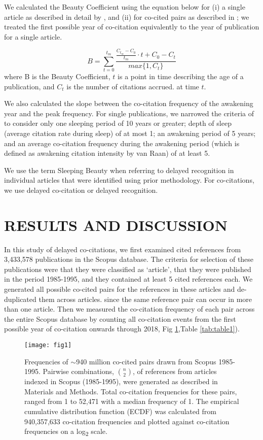\documentclass[utf8]{frontiersSCNS}
\begin{document}
We calculated the Beauty Coefficient using the equation below for (i) a single article as described in detail by \cite{Ke2015}, and (ii) for co-cited pairs as described in \cite{devarakonda_2020}; we treated the first possible year of co-citation equivalently to the year of publication for a single article. 

$$ B=  \sum_{t=0}^{t_m} \frac {\frac{C_{t_m} - C_0}{t_m} \cdot t + C_0 - C_t} {max\{1,C_t\}} $$ where B is the Beauty Coefficient, $t$ is a point in time describing the age of a publication, and $C_t$ is the number of citations accrued. at time $t$. 

We  also calculated the slope between the co-citation frequency of the awakening year and the peak frequency. For single publications, we narrowed the criteria of \cite{Raan2019} to consider only one sleeping period of 10 years or greater; depth of sleep (average citation rate during sleep) of at most 1; an awakening period of 5 years; and an average co-citation frequency during the awakening period (which is defined as awakening citation intensity by van Raan) of at least 5. 

We use the term Sleeping Beauty when referring to delayed recognition in individual articles that were identified using prior methodology. For co-citations, we use delayed co-citation or delayed recognition.

\section{RESULTS AND DISCUSSION}

In this study of delayed co-citations, we first examined cited references from 3,433,578 publications in the Scopus database. The criteria for selection of these publications were that they were classified as `article', that they were published in the period 1985-1995, and they contained at least 5 cited references each. We generated all possible co-cited pairs for the references in these articles and de-duplicated them across articles. since the same reference pair can occur in more than one article. Then we measured the co-citation frequency of each pair across the entire Scopus database by counting all co-citation events from the first possible year of co-citation onwards through 2018, Fig \ref{fig:fig1},Table \ref{tab:table1}).

\begin{figure}[h!]
\begin{center}
\texttt{[image: fig1]}%
\end{center}
\caption{Frequencies of $\sim$940 million co-cited pairs drawn from Scopus 1985-1995. Pairwise combinations, $n\choose 2$, of references from articles indexed in Scopus (1985-1995), were generated as described in Materials and Methods. Total co-citation frequencies for these pairs, ranged from 1 to 52,471 with a median frequency of 1. The empirical cumulative distribution function (ECDF) was calculated from 940,357,633 co-citation frequencies and plotted against co-citation frequencies on a log\textsubscript{2} scale.}
\label{fig:fig1}
\end{figure}
\end{document}
